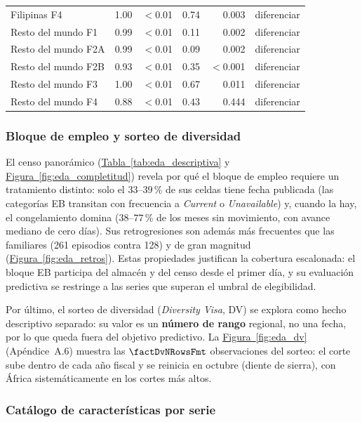 \documentclass[12pt,letterpaper]{report}
\begin{document}
\begin{table}[htbp]
\begin{tabular}{lrrrrl}
Filipinas F4 & 1.00 & $<$0.01 & 0.74 & 0.003 & diferenciar \\
Resto del mundo F1 & 0.99 & $<$0.01 & 0.11 & 0.002 & diferenciar \\
Resto del mundo F2A & 0.99 & $<$0.01 & 0.09 & 0.002 & diferenciar \\
Resto del mundo F2B & 0.93 & $<$0.01 & 0.35 & $<$0.001 & diferenciar \\
Resto del mundo F3 & 1.00 & $<$0.01 & 0.67 & 0.011 & diferenciar \\
Resto del mundo F4 & 0.88 & $<$0.01 & 0.43 & 0.444 & diferenciar \\
\bottomrule
\end{tabular}
\end{table}


\subsubsection{Bloque de empleo y sorteo de diversidad}


El censo panorámico (\hyperref[tab:eda_descriptiva]{Tabla~\ref*{tab:eda_descriptiva}} y
\hyperref[fig:eda_completitud]{Figura~\ref*{fig:eda_completitud}}) revela por qué el bloque de empleo requiere un
tratamiento distinto: solo el $33$--$39$\,\% de sus celdas tiene fecha publicada
(las categorías EB transitan con frecuencia a \textit{Current} o
\textit{Unavailable}) y, cuando la hay, el congelamiento domina ($38$--$77$\,\% de
los meses sin movimiento, con avance mediano de cero días). Sus retrogresiones son
además más frecuentes que las familiares (261 episodios contra 128) y de gran
magnitud (\hyperref[fig:eda_retros]{Figura~\ref*{fig:eda_retros}}). Estas propiedades justifican la cobertura
escalonada: el bloque EB participa del almacén y del censo desde el primer día, y su
evaluación predictiva se restringe a las series que superan el umbral de
elegibilidad.


Por último, el sorteo de diversidad (\textit{Diversity Visa}, DV) se explora como
hecho descriptivo separado: su valor es un \textbf{número de rango} regional, no una
fecha, por lo que queda fuera del objetivo predictivo. La \hyperref[fig:eda_dv]{Figura~\ref*{fig:eda_dv}} (Apéndice~A.6)
muestra las $\factDvNRowsFmt$ observaciones del sorteo: el corte sube dentro de cada año fiscal y se
reinicia en octubre (diente de sierra), con África sistemáticamente en los cortes
más altos.


\subsubsection{Catálogo de características por serie}
\end{document}
